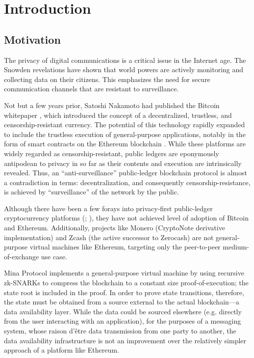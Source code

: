 \chapter{Introduction}

\label{Introduction}

\section{Motivation}\label{motivation}

The privacy of digital communications is a critical issue in the Internet age. The Snowden revelations \parencite{greenwald_nsa_2013} have shown that world powers are actively monitoring and collecting data on their citizens. This emphasizes the need for secure communication channels that are resistant to surveillance.

Not but a few years prior, Satoshi Nakamoto had published the Bitcoin whitepaper \parencite{nakamoto_bitcoin_2008}, which introduced the concept of a decentralized, trustless, and censorship-resistant currency. The potential of this technology rapidly expanded to include the trustless execution of general-purpose applications, notably in the form of smart contracts on the Ethereum blockchain \parencite{buterin_ethereum_2014}. While these platforms are widely regarded as censorship-resistant, public ledgers are eponymously antipodean to privacy in so far as their contents and execution are intrinsically revealed. Thus, an ``anti-surveillance'' public-ledger blockchain protocol is almost a contradiction in terms: decentralization, and consequently censorship-resistance, is achieved by ``surveillance'' of the network by the public.

Although there have been a few forays into privacy-first public-ledger cryptocurrency platforms (\cite[CryptoNote:][]{saberhagen_cryptonote_2013}; \cite[Zerocash:][]{sasson_zerocash_2014}), they have not achieved level of adoption of Bitcoin and Ethereum. Additionally, projects like Monero (CryptoNote derivative implementation) and Zcash (the active successor to Zerocash) are not general-purpose virtual machines like Ethereum, targeting only the peer-to-peer medium-of-exchange use case.

Mina Protocol implements a general-purpose virtual machine by using recursive zk-SNARKs to compress the blockchain to a constant size proof-of-execution; the state root is included in the proof. \parencite{bonneau_mina_2020} In order to prove state transitions, therefore, the state must be obtained from a source external to the actual blockchain---a data availability layer. While the data could be sourced elsewhere (e.g. directly from the user interacting with an application), for the purposes of a messaging system, whose raison d'\^{e}tre data transmission from one party to another, the data availability infrastructure is not an improvement over the relatively simpler approach of a platform like Ethereum.

